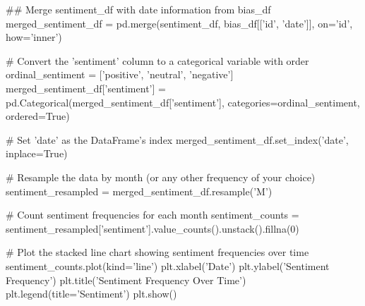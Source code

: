 \begin{pyin}
\## Merge sentiment_df with date information from bias_df
merged_sentiment_df = pd.merge(sentiment_df, bias_df[['id', 'date']], on='id', how='inner')

# Convert the 'sentiment' column to a categorical variable with order
ordinal_sentiment = ['positive', 'neutral', 'negative']
merged_sentiment_df['sentiment'] = pd.Categorical(merged_sentiment_df['sentiment'], categories=ordinal_sentiment, ordered=True)

# Set 'date' as the DataFrame's index
merged_sentiment_df.set_index('date', inplace=True)

# Resample the data by month (or any other frequency of your choice)
sentiment_resampled = merged_sentiment_df.resample('M')

# Count sentiment frequencies for each month
sentiment_counts = sentiment_resampled['sentiment'].value_counts().unstack().fillna(0)

# Plot the stacked line chart showing sentiment frequencies over time
sentiment_counts.plot(kind='line')
plt.xlabel('Date')
plt.ylabel('Sentiment Frequency')
plt.title('Sentiment Frequency Over Time')
plt.legend(title='Sentiment')
plt.show()

\end{pyin}

